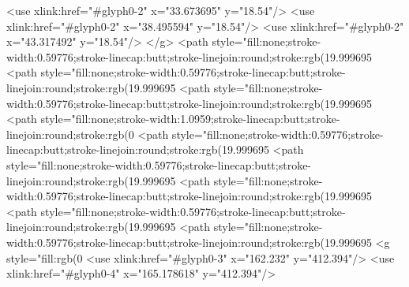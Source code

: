   <use xlink:href="#glyph0-2" x="33.673695" y="18.54"/>
  <use xlink:href="#glyph0-2" x="38.495594" y="18.54"/>
  <use xlink:href="#glyph0-2" x="43.317492" y="18.54"/>
</g>
<path style="fill:none;stroke-width:0.59776;stroke-linecap:butt;stroke-linejoin:round;stroke:rgb(19.999695%
<path style="fill:none;stroke-width:0.59776;stroke-linecap:butt;stroke-linejoin:round;stroke:rgb(19.999695%
<path style="fill:none;stroke-width:0.59776;stroke-linecap:butt;stroke-linejoin:round;stroke:rgb(19.999695%
<path style="fill:none;stroke-width:1.0959;stroke-linecap:butt;stroke-linejoin:round;stroke:rgb(0%
<path style="fill:none;stroke-width:0.59776;stroke-linecap:butt;stroke-linejoin:round;stroke:rgb(19.999695%
<path style="fill:none;stroke-width:0.59776;stroke-linecap:butt;stroke-linejoin:round;stroke:rgb(19.999695%
<path style="fill:none;stroke-width:0.59776;stroke-linecap:butt;stroke-linejoin:round;stroke:rgb(19.999695%
<path style="fill:none;stroke-width:0.59776;stroke-linecap:butt;stroke-linejoin:round;stroke:rgb(19.999695%
<path style="fill:none;stroke-width:0.59776;stroke-linecap:butt;stroke-linejoin:round;stroke:rgb(19.999695%
<g style="fill:rgb(0%
  <use xlink:href="#glyph0-3" x="162.232" y="412.394"/>
  <use xlink:href="#glyph0-4" x="165.178618" y="412.394"/>
